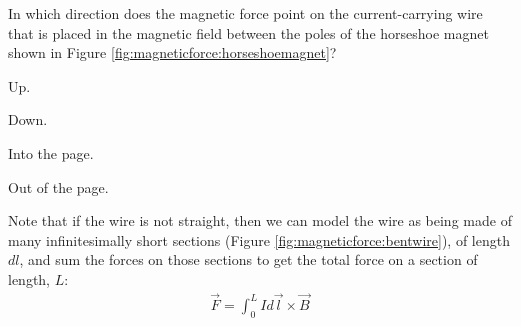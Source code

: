 \begin{checkpoint}{}
	\begin{MCquestion}{In which direction does the magnetic force point on the current-carrying wire that is placed in the magnetic field between the poles of the horseshoe magnet shown in Figure \ref{fig:magneticforce:horseshoemagnet}?}
		\item Up. \correct
		\item Down.
		\item Into the page.
		\item Out of the page.
	\end{MCquestion}
\end{checkpoint}

Note that if the wire is not straight, then we can model the wire as being made of many infinitesimally short sections (Figure \ref{fig:magneticforce:bentwire}), of length $dl$, and sum the forces on those sections to get the total force on a section of length, $L$:
\begin{align*}
\vec F = \int_0^L I d\vec l \times \vec B
\end{align*}

